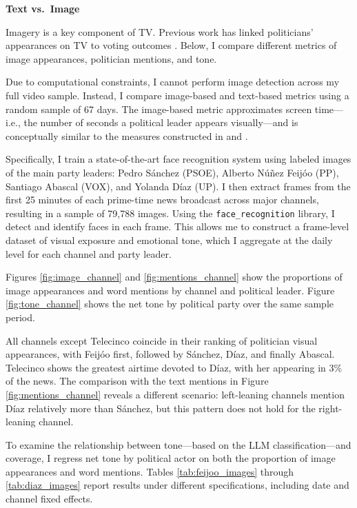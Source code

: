 \documentclass[12pt]{article}
\begin{document}
\textbf{Text vs.\ Image}

Imagery is a key component of TV. Previous work has linked politicians’ appearances on TV to voting outcomes \citep{tv_appeareance}. Below, I compare different metrics of image appearances, politician mentions, and tone.

Due to computational constraints, I cannot perform image detection across my full video sample. Instead, I compare image-based and text-based metrics using a random sample of 67 days. The image-based metric approximates screen time—i.e., the number of seconds a political leader appears visually—and is conceptually similar to the measures constructed in \cite{CageHengelHerveUrvoy2022} and \cite{durante2012partisan}.

Specifically, I train a state-of-the-art face recognition system \citep{face_recognition} using labeled images of the main party leaders: Pedro Sánchez (PSOE), Alberto Núñez Feijóo (PP), Santiago Abascal (VOX), and Yolanda Díaz (UP). I then extract frames from the first 25 minutes of each prime-time news broadcast across major channels, resulting in a sample of 79,788 images. Using the \texttt{face\_recognition} library, I detect and identify faces in each frame. This allows me to construct a frame-level dataset of visual exposure and emotional tone, which I aggregate at the daily level for each channel and party leader.

Figures \ref{fig:image_channel} and \ref{fig:mentions_channel} show the proportions of image appearances and word mentions by channel and political leader. Figure \ref{fig:tone_channel} shows the net tone by political party over the same sample period.

All channels except Telecinco coincide in their ranking of politician visual appearances, with Feijóo first, followed by Sánchez, Díaz, and finally Abascal. Telecinco shows the greatest airtime devoted to Díaz, with her appearing in 3\% of the news. The comparison with the text mentions in Figure \ref{fig:mentions_channel} reveals a different scenario: left-leaning channels mention Díaz relatively more than Sánchez, but this pattern does not hold for the right-leaning channel.

To examine the relationship between tone—based on the LLM classification—and coverage, I regress net tone by political actor on both the proportion of image appearances and word mentions. Tables \ref{tab:feijoo_images} through \ref{tab:diaz_images} report results under different specifications, including date and channel fixed effects.
\end{document}
